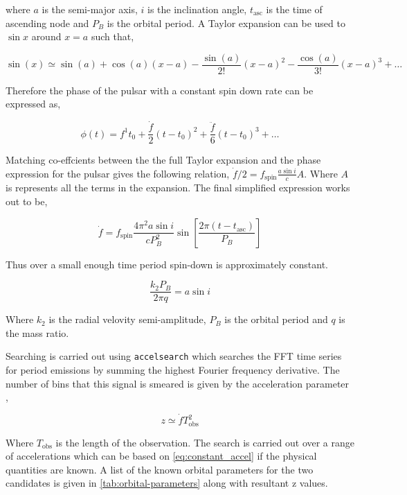 where $a$ is the semi-major axis, $i$ is the inclination angle, $t_{\text{asc}}$ is the time of ascending node and $P_B$ is the orbital period. A Taylor expansion can be used to $\sin x$ around $x = a$ such that, 

\begin{equation}
    \sin (x) \simeq   \sin (a) + \cos (a)(x - a) - \frac{\sin (a)}{2!}(x - a)^2 - \frac{\cos (a)}{3!}(x - a)^3 + \ldots
\end{equation}

Therefore the phase of the pulsar with a constant spin down rate can be expressed as, 

\begin{equation}
  \phi(t) = f^1 t_0 + \frac{\dot f}{2} (t - t_0)^2 + \frac{\ddot f}{6} (t - t_0)^3 + \ldots 
\end{equation}

Matching co-effcients between the the full Taylor expansion and the phase expression for the pulsar gives the following relation, $\dot f/2 = f_{\text{spin}} \frac{a \sin i}{c} A$. Where $A$ is represents all the terms in the expansion. The final simplified expression works out to be, 

\begin{equation}
    \dot f = f_\text{spin} \frac{4 \pi^2 a \sin i }{cP^2_B} \sin \left[ \frac{2 \pi (t - t_{\text{asc}})}{P_B} \right]
\end{equation}

Thus over a small enough time period spin-down is approximately constant.

\begin{equation}
    \frac{k_2 P_B}{2 \pi q} = a \sin i   
    \label{eq:constant_accel}
\end{equation}

Where $k_2$ is the radial velovity semi-amplitude, $P_B$ is the orbital period and $q$ is the mass ratio.

Searching is carried out using \texttt{accelsearch} which searches the FFT time series for period emissions by summing the highest Fourier frequency derivative. The number of bins that this signal is smeared is given by the acceleration parameter \citep{ransom_new_2001}, 

\begin{equation}
    z \simeq \dot f T^2_{\text{obs}}
\end{equation}

Where $T_{\text{obs}}$ is the length of the observation. The search is carried out over a range of accelerations which can be based on \cref{eq:constant_accel} if the physical quantities are known. A list of the known orbital parameters for the two candidates is given in \cref{tab:orbital-parameters} along with resultant z values.
 
